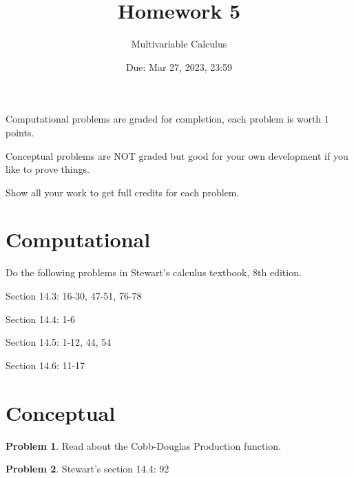 \documentclass[12pt]{article}
\title{Homework 5}
\author{ Multivariable Calculus}
\date{Due: Mar 27, 2023, 23:59}
\theoremstyle{definition}
\newtheorem{problem}{Problem}
\begin{document}
\maketitle

Computational problems are graded for completion, each problem is worth 1 points.

Conceptual problems are NOT graded but good for your own development if you like to prove things.

Show all your work to get full credits for each problem.
\section{Computational}
Do the following problems in Stewart's calculus textbook, 8th edition.

Section 14.3: 16-30, 47-51, 76-78

Section 14.4: 1-6 

Section 14.5: 1-12, 44, 54

Section 14.6: 11-17



\section{Conceptual}

\begin{problem}
    Read about the Cobb-Douglas Production function.
\end{problem}

\begin{problem}
    Stewart's section 14.4: 92
\end{problem}


%
\end{document}
